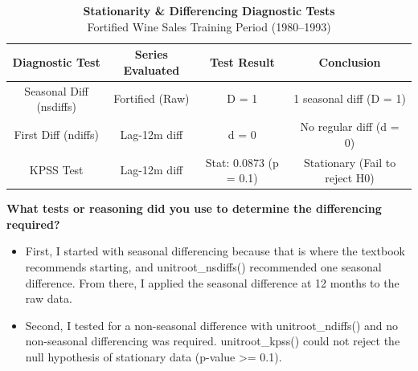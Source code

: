 \documentclass[
  letterpaper,
  DIV=11,
  numbers=noendperiod]{scrartcl}
\providecommand{\tightlist}{%
  \setlength{\itemsep}{0pt}\setlength{\parskip}{0pt}}
\begin{document}
\begin{table}
\caption*{
{\fontsize{15}{19}\selectfont  \textbf{Stationarity \& Differencing Diagnostic Tests}\fontsize{12}{15}\selectfont } \\ 
{\fontsize{11}{14}\selectfont  Fortified Wine Sales Training Period (1980–1993)\fontsize{12}{15}\selectfont }
} 
\fontsize{12.0pt}{14.0pt}\selectfont
\begin{tabular*}{\linewidth}{@{\extracolsep{\fill}}cccc}
\toprule
Diagnostic Test & Series Evaluated & Test Result & Conclusion \\ 
\midrule\addlinespace[2.5pt]
Seasonal Diff (nsdiffs) & Fortified (Raw) & D = 1 & 1 seasonal diff (D = 1) \\ 
First Diff (ndiffs) & Lag-12m diff & d = 0 & No regular diff (d = 0) \\ 
KPSS Test & Lag-12m diff & Stat: 0.0873 (p = 0.1) & Stationary (Fail to reject H0) \\ 
\bottomrule
\end{tabular*}
\end{table}

\textbf{What tests or reasoning did you use to determine the
differencing required?}

\begin{itemize}
\tightlist
\item
  First, I started with seasonal differencing because that is where the
  textbook recommends starting, and unitroot\_nsdiffs() recommended one
  seasonal difference. From there, I applied the seasonal difference at
  12 months to the raw data.
\item
  Second, I tested for a non-seasonal difference with unitroot\_ndiffs()
  and no non-seasonal differencing was required. unitroot\_kpss() could
  not reject the null hypothesis of stationary data (p-value
  \textgreater= 0.1).
\end{itemize}

\newpage
\end{document}
